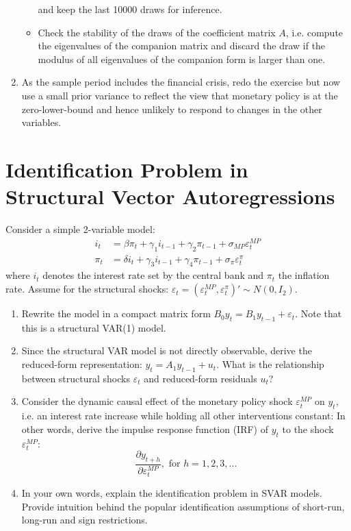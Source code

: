 \documentclass[a4paper]{scrartcl}
\begin{document}
\begin{enumerate}
\begin{itemize}
                        and keep the last 10000 draws for inference. 
                  \item Check the stability of the draws of the coefficient matrix $A$, i.e. compute the eigenvalues of the companion matrix and discard the draw if the modulus of all eigenvalues of the companion form is larger than one.
              \end{itemize}
        \item As the sample period includes the financial crisis, redo the exercise but now use a small prior variance to reflect the view that monetary policy is at the zero-lower-bound and hence unlikely to respond to changes in the other variables.
    \end{enumerate}
    \newpage
    
    \section{Identification Problem in Structural Vector Autoregressions}
    Consider a simple 2-variable model:
    \begin{align*}
        i_t   & =  \beta \pi_t + \gamma_1 i_{t-1} + \gamma_2 \pi_{t-1} + \sigma_{MP} \varepsilon_t^{MP}  \\
        \pi_t & =  \delta i_t + \gamma_3 i_{t-1} + \gamma_4 \pi_{t-1} + \sigma_{\pi} \varepsilon_t^{\pi}
    \end{align*}
    where $i_t$ denotes the interest rate set by the central bank and $\pi_t$ the inflation rate. Assume 
    for the structural shocks: $\varepsilon_{t}=(\varepsilon_t^{MP}, \varepsilon_t^{\pi})' \sim N(0,I_2)$.
    \begin{enumerate}
        \item Rewrite the model in a compact matrix form $B_0 y_t = B_1 y_{t-1} + \varepsilon_{t}$. Note that this is a structural VAR(1) model.
        \item Since the structural VAR model is not directly observable, derive the reduced-form representation: $y_t=A_1 y_{t-1} + u_t$. What is the relationship between structural shocks $\varepsilon_t$ and reduced-form residuals $u_t$?
        \item Consider the dynamic causal effect of the monetary policy shock $\varepsilon_t^{MP}$ on $y_t$, i.e. an interest rate increase while holding all other interventions constant: In other words, derive the impulse response function (IRF) of $y_t$ to the shock $\varepsilon_t^{MP}$: $$\frac{\partial y_{t+h}}{\partial \varepsilon_t^{MP}}, \text{ for } h=1,2,3,...$$
        \item In your own words, explain the identification problem in SVAR models. Provide intuition behind the popular identification assumptions of short-run, long-run and sign restrictions.
    \end{enumerate}
    \newpage
    
\end{document}

